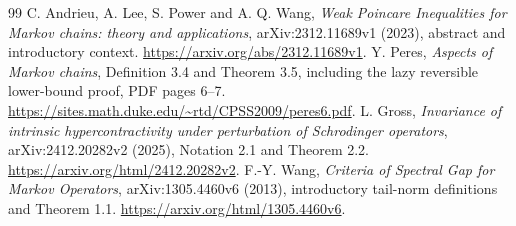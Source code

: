 \documentclass[11pt]{article}
\begin{document}
\begin{thebibliography}{99}
 C. Andrieu, A. Lee, S. Power and A. Q. Wang, \emph{Weak Poincare Inequalities for Markov chains: theory and applications}, arXiv:2312.11689v1 (2023), abstract and introductory context. \url{https://arxiv.org/abs/2312.11689v1}.
 Y. Peres, \emph{Aspects of Markov chains}, Definition 3.4 and Theorem 3.5, including the lazy reversible lower-bound proof, PDF pages 6--7. \url{https://sites.math.duke.edu/~rtd/CPSS2009/peres6.pdf}.
 L. Gross, \emph{Invariance of intrinsic hypercontractivity under perturbation of Schrodinger operators}, arXiv:2412.20282v2 (2025), Notation 2.1 and Theorem 2.2. \url{https://arxiv.org/html/2412.20282v2}.
 F.-Y. Wang, \emph{Criteria of Spectral Gap for Markov Operators}, arXiv:1305.4460v6 (2013), introductory tail-norm definitions and Theorem 1.1. \url{https://arxiv.org/html/1305.4460v6}.
\end{thebibliography}
\end{document}
